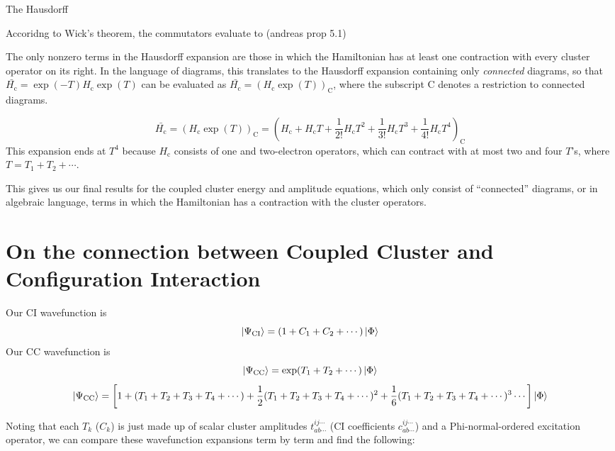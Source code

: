 \documentclass{article}
\newcommand{\Hc}{H_{\mathrm{c}}}
\begin{document}
%
The Hausdorff

Accoridng to Wick's theorem, the commutators evaluate to (andreas prop 5.1)

The only nonzero terms in the Hausdorff expansion are those
in which the Hamiltonian has at least one contraction with every cluster
operator on its right. 
In the language of diagrams, this translates to the Hausdorff expansion 
containing only \textit{connected} diagrams,
so that $\bar{\Hc} = \exp(-T) \Hc \exp(T)$ can be evaluated as $\bar{\Hc} = (\Hc \exp(T))_{\mathrm{C}}$,
where the subscript $\mathrm{C}$ denotes a restriction to connected diagrams.

\[\bar{\Hc} = (\Hc \exp(T))_{\mathrm{C}} = (\Hc + \Hc T + \frac{1}{2!} \Hc T^2 + \frac{1}{3!} \Hc T^3 + \frac{1}{4!} \Hc T^4)_{\mathrm{C}}\]
This expansion ends at $T^4$ because $\Hc$ consists of one and two-electron operators,
which can contract with at most two and four $T$'s, where $T = T_1 + T_2 + \cdots$.

This gives us our final results for the coupled cluster energy and amplitude equations,
which only consist of ``connected'' diagrams, or in algebraic language, terms in which
the Hamiltonian has a contraction with the cluster operators.

\section{On the connection between Coupled Cluster and Configuration Interaction}
Our CI wavefunction is  
\[ \ket{\Psi_{\mathrm{CI}}} = (1  + C_1 + C_2 + \cdots) \ket{\Phi}  \]
Our CC wavefunction is 
\[ \ket{\Psi_{\mathrm{CC}}} = \exp(T_1 + T_2 + \cdots) \ket{\Phi}  \]
\[ \ket{\Psi_{\mathrm{CC}}} = \left[ 1 + (T_1 + T_2 + T_3 + T_4 + \cdots ) + \frac{1}{2} (T_1 + T_2 + T_3 + T_4 + \cdots)^2 +  \frac{1}{6} (T_1 + T_2 + T_3 + T_4 + \cdots)^3 \cdots \right] \ket{\Phi}  \]

Noting that each $T_k$ ($C_k$) is just made up of scalar cluster amplitudes 
$t_{ab \cdots}^{ij \cdots}$ (CI coefficients $c_{ab \cdots}^{ij \cdots}$) 
and a Phi-normal-ordered excitation operator,  we can compare these wavefunction 
expansions term by term and find the following:
\end{document}
